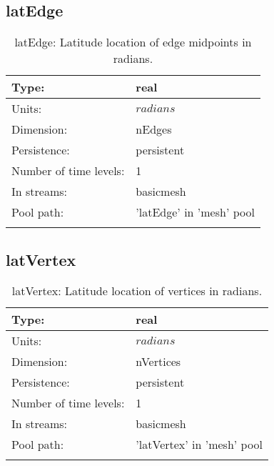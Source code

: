 \subsection[latEdge]{latEdge}
\label{subsec:var_sec_mesh_latEdge}
\begin{center}
\begin{longtable}{| p{2.0in} | p{4.0in} |}
        \hline 
        Type: & real \\
        \hline 
        Units: & $radians$ \\
        \hline 
        Dimension: & nEdges \\
        \hline 
        Persistence: & persistent \\
        \hline 
        Number of time levels: & 1 \\
        \hline 
		 In streams: &  basicmesh \\
        \hline 
            Pool path: & 'latEdge' in 'mesh' pool
 \\
		 \hline 
    \caption{latEdge: Latitude location of edge midpoints in radians.}
\end{longtable}
\end{center}
\subsection[latVertex]{latVertex}
\label{subsec:var_sec_mesh_latVertex}
\begin{center}
\begin{longtable}{| p{2.0in} | p{4.0in} |}
        \hline 
        Type: & real \\
        \hline 
        Units: & $radians$ \\
        \hline 
        Dimension: & nVertices \\
        \hline 
        Persistence: & persistent \\
        \hline 
        Number of time levels: & 1 \\
        \hline 
		 In streams: &  basicmesh \\
        \hline 
            Pool path: & 'latVertex' in 'mesh' pool
 \\
		 \hline 
    \caption{latVertex: Latitude location of vertices in radians.}
\end{longtable}
\end{center}
